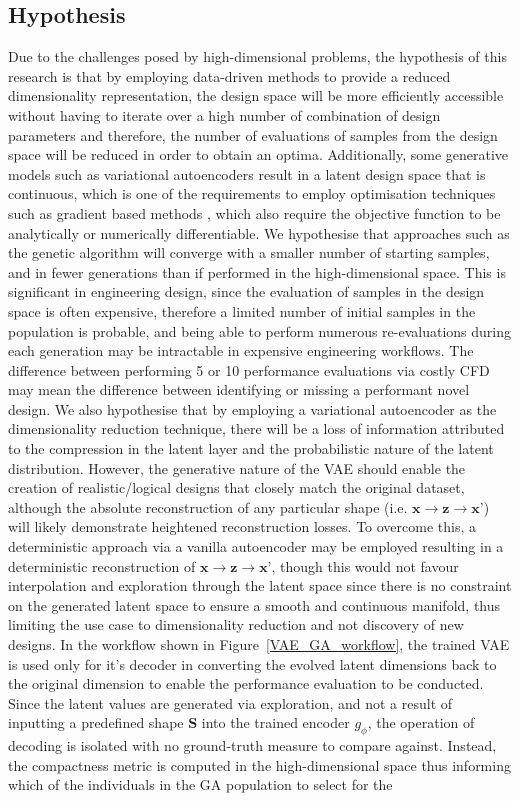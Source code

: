 \documentclass{article}
\begin{document}
\subsection{Hypothesis}

Due to the challenges posed by high-dimensional problems, the hypothesis of this research is that by employing data-driven methods to provide a reduced dimensionality representation,  the design space will be more efficiently accessible without having to iterate over a high number of combination of design parameters and therefore, the number of evaluations of samples from the design space will be reduced in order to obtain an optima. 
Additionally, some generative models such as variational autoencoders result in a latent design space that is continuous, which is one of the requirements to employ optimisation techniques such as gradient based methods \citep{Archbold2024}, which also require the objective function to be analytically or numerically differentiable. We hypothesise that approaches such as the genetic algorithm will converge with a smaller number of starting samples, and in fewer generations than if performed in the high-dimensional space. This is significant in engineering design, since the evaluation of samples in the design space is often expensive, therefore a limited number of initial samples in the population is probable, and being able to perform numerous re-evaluations during each generation may be intractable in expensive engineering workflows. The difference between performing 5 or 10 performance evaluations via costly CFD may mean the difference between identifying or missing a performant novel design. We also hypothesise that by employing a variational autoencoder as the dimensionality reduction technique, there will be a loss of information attributed to the compression in the latent layer and the probabilistic nature of the latent distribution. However, the generative nature of the VAE should enable the creation of realistic/logical designs that closely match the original dataset, although the absolute reconstruction of any particular shape (i.e. $\textbf{x} \rightarrow \textbf{z} \rightarrow \textbf{x'}$) will likely demonstrate heightened reconstruction losses. To overcome this, a deterministic approach via a vanilla autoencoder may be employed resulting in a deterministic reconstruction of $\textbf{x}\rightarrow\textbf{z}\rightarrow\textbf{x'}$, though this would not favour interpolation and exploration through the latent space since there is no constraint on the generated latent space to ensure a smooth and continuous manifold, thus limiting the use case to dimensionality reduction and not discovery of new designs. In the workflow shown in Figure~\ref{VAE_GA_workflow}, the trained VAE is used only for it's decoder in converting the evolved latent dimensions back to the original dimension to enable the performance evaluation to be conducted. Since the latent values are generated via exploration, and not a result of inputting a predefined shape $\textbf{S}$ into the trained encoder $g_\phi$, the operation of decoding is isolated with no ground-truth measure to compare against. Instead, the compactness metric is computed in the high-dimensional space thus informing which of the individuals in the GA population to select for the 
\end{document}
